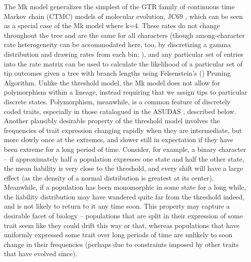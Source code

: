 \documentclass[10pt, twocolumn, twoside]{article}
\begin{document}
The Mk model generalizes the simplest of the GTR family of continuous time Markov chain (CTMC) models of molecular evolution, JC69 \citep{jukesEvolutionProteinMolecules1969}, which can be seen as a special case of the Mk model where k=4. These rates do not change throughout the tree and are the same for all characters (though among-character rate heterogeneity can be accommodated here, too, by discretizing a gamma distribution and drawing rates from each bin; \citealt{yangMaximumLikelihoodPhylogenetic1994}), and any particular set of entries into the rate matrix can be used to calculate the likelihood of a particular set of tip outcomes given a tree with branch lengths using Felsenstein’s (\citeyear{felsensteinMaximumlikelihoodEstimationEvolutionary1973}) Pruning Algorithm. Unlike the threshold model, the Mk model does not allow for polymorphism within a lineage, instead requiring that we assign tips to particular discrete states. Polymorphism, meanwhile, is a common feature of discretely coded traits, especially in those catalogued in the ASUDAS \citep{scottAnthropologyModernHuman2018}, described below. Another plausibly desirable property of the threshold model involves the frequencies of trait expression changing rapidly when they are intermediate, but more slowly once at the extremes, and slower still in expectation if they have been extreme for a long period of time. Consider, for example, a binary character – if approximately half a population expresses one state and half the other state, the mean liability is very close to the threshold, and every shift will have a large effect (as the density of a normal distribution is greatest at its center). Meanwhile, if a population has been monomorphic in some state for a long while, the liability distribution may have wandered quite far from the threshold indeed, and is not likely to return to it any time soon. This property may capture a desirable facet of biology – populations that are split in their expression of some trait seem like they could drift this way or that, whereas populations that have uniformly expressed some trait over long periods of time are unlikely to soon change in their frequencies (perhaps due to constraints imposed by other traits that have evolved since). 
\end{document}
